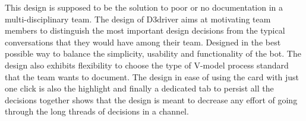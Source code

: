 This design is supposed to be the solution to poor or no documentation in a multi-disciplinary team. The design of D3driver aims at motivating team members to distinguish the most important design decisions from the typical conversations that they would have among their team. Designed in the best possible way to balance the simplicity, usability and functionality of the bot. The design also exhibits flexibility to choose the type of V-model process standard that the team wants to document. The design in ease of using the card with just one click is also the highlight and finally a dedicated tab to persist all the decisions together shows that the design is meant to decrease any effort of going through
the long threads of decisions in a channel.













